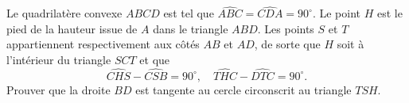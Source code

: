 Le quadrilatère convexe $ABCD$ est tel que $\widehat{ABC} = \widehat{CDA} = 90^\circ$. Le point $H$ est le pied
de la hauteur issue de $A$ dans le triangle $ABD$. Les points $S$ et $T$ appartiennent respectivement aux côtés
$AB$ et $AD$, de sorte que $H$ soit à l'intérieur du triangle $SCT$ et que
\[
\widehat{CHS} - \widehat{CSB} = 90^\circ, \quad \widehat{THC} - \widehat{DTC} = 90^\circ.
\]
Prouver que la droite $BD$ est tangente au cercle circonscrit au triangle $TSH$.
